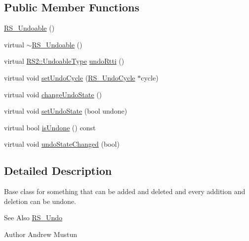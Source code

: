 \subsection*{Public Member Functions}
\begin{DoxyCompactItemize}
\item 
\hyperlink{classRS__Undoable_a6c18486e7d9835d1f01c40159b65589d}{R\-S\-\_\-\-Undoable} ()
\item 
virtual \hyperlink{classRS__Undoable_a6233ad4a789bac1057379dab6a51a90a}{$\sim$\-R\-S\-\_\-\-Undoable} ()
\item 
virtual \hyperlink{classRS2_ab5fe5e99761abbb178f2e132d4ac84ee}{R\-S2\-::\-Undoable\-Type} \hyperlink{classRS__Undoable_a82cbb94a22101e252be773b1f60630b3}{undo\-Rtti} ()
\item 
virtual void \hyperlink{classRS__Undoable_a3f529e443cff66f29407e2d42e368a31}{set\-Undo\-Cycle} (\hyperlink{classRS__UndoCycle}{R\-S\-\_\-\-Undo\-Cycle} $\ast$cycle)
\item 
virtual void \hyperlink{classRS__Undoable_af87cf57be35694730b4fe25248956ad8}{change\-Undo\-State} ()
\item 
virtual void \hyperlink{classRS__Undoable_ad527222fbb916d1b1360815b12eef618}{set\-Undo\-State} (bool undone)
\item 
virtual bool \hyperlink{classRS__Undoable_a94bf4f10d1060e8a831ffeeaaf7952e8}{is\-Undone} () const 
\item 
virtual void \hyperlink{classRS__Undoable_a8db54f4812aafa6772ddd375a66e21bb}{undo\-State\-Changed} (bool)
\end{DoxyCompactItemize}


\subsection{Detailed Description}
Base class for something that can be added and deleted and every addition and deletion can be undone.

\begin{DoxySeeAlso}{See Also}
\hyperlink{classRS__Undo}{R\-S\-\_\-\-Undo} 
\end{DoxySeeAlso}
\begin{DoxyAuthor}{Author}
Andrew Mustun 
\end{DoxyAuthor}


